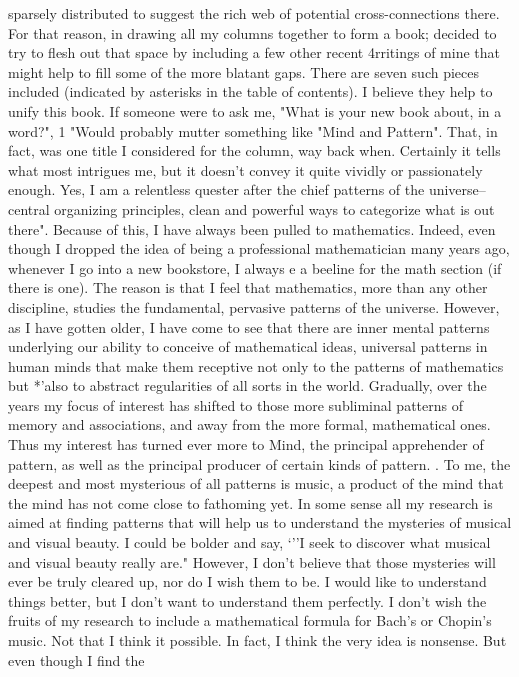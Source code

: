 sparsely distributed to suggest the rich web of potential cross-connections there. For
that reason, in drawing all my columns together to form a book; decided to try to flesh
out that space by including a few other recent 4rritings of mine that might help to fill
some of the more blatant gaps. There are seven such pieces included (indicated by
asterisks in the table of contents). I believe they help to unify this book.
        If someone were to ask me, "What is your new book about, in a word?", 1
"Would probably mutter something like "Mind and Pattern". That, in fact, was one
title I considered for the column, way back when. Certainly it tells what most
intrigues me, but it doesn't convey it quite vividly or passionately enough. Yes, I am a
relentless quester after the chief patterns of the universe--central organizing
principles, clean and powerful ways to categorize what is out there". Because of this, I
have always been pulled to mathematics. Indeed, even though I dropped the idea of
being a professional mathematician many years ago, whenever I go into a new
bookstore, I always e a beeline for the math section (if there is one). The reason is that
I feel that mathematics, more than any other discipline, studies the fundamental,
pervasive patterns of the universe. However, as I have gotten older, I have come to
see that there are inner mental patterns underlying our ability to conceive of
mathematical ideas, universal patterns in human minds that make them receptive not
only to the patterns of mathematics but *'also to abstract regularities of all sorts in the
world. Gradually, over the years my focus of interest has shifted to those more
subliminal patterns of memory and associations, and away from the more formal,
mathematical ones. Thus my interest has turned ever more to Mind, the principal
apprehender of pattern, as well as the principal producer of certain kinds of pattern. .
        To me, the deepest and most mysterious of all patterns is music, a product of
the mind that the mind has not come close to fathoming yet. In some sense all my
research is aimed at finding patterns that will help us to understand the mysteries of
musical and visual beauty. I could be bolder and say, `''I seek to discover what
musical and visual beauty really are." However, I don't believe that those mysteries
will ever be truly cleared up, nor do I wish them to be. I would like to understand
things better, but I don't want to understand them perfectly. I don't wish the fruits of
my research to include a mathematical formula for Bach's or Chopin's music. Not that
I think it possible. In fact, I think the very idea is nonsense. But even though I find the
